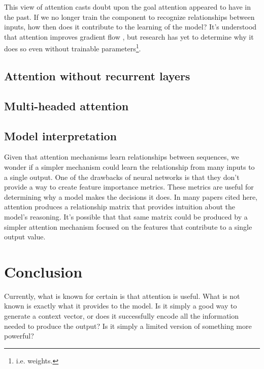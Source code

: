 \documentclass{article}
\begin{document}
This view of attention casts doubt upon the goal attention appeared to have in the past. If we no longer train the component to recognize relationships between inputs, how then does it contribute to the learning of the model? It's understood that attention improves gradient flow \cite{massive_exploration}, but research has yet to determine why it does so even without trainable parameters\footnote{i.e. weights.}.

\subsection{Attention without recurrent layers}

\cite{attn_all_you_need}

\subsection{Multi-headed attention}\label{section:multi_headed}

\cite{attn_all_you_need}

\subsection{Model interpretation}

Given that attention mechanisms learn relationships between sequences, we wonder if a simpler mechanism could learn the relationship from many inputs to a single output. One of the drawbacks of neural networks is that they don't provide a way to create feature importance metrics. These metrics are useful for determining why a model makes the decisions it does. In many papers cited here, attention produces a relationship matrix that provides intuition about the model's reasoning. It's possible that that same matrix could be produced by a simpler attention mechanism focused on the features that contribute to a single output value.

\section{Conclusion}

Currently, what is known for certain is that attention is useful. What is not known is exactly what it provides to the model. Is it simply a good way to generate a context vector, or does it successfully encode all the information needed to produce the output? Is it simply a limited version of something more powerful?



\end{document}
